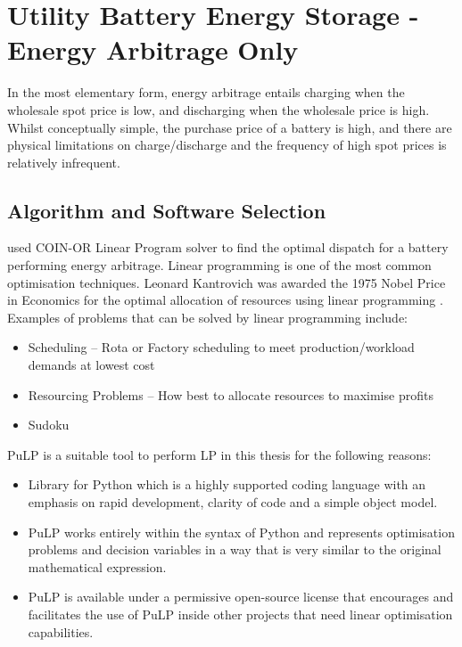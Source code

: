 \chapter{ Utility Battery Energy Storage - Energy Arbitrage Only}
\label{sec:energy_arbitrage}
In the most elementary form, energy arbitrage entails charging when the wholesale spot price is low, and discharging when the wholesale price is high. Whilst conceptually simple, the purchase price of a battery is high, and there are physical limitations on charge/discharge and the frequency of high spot prices is relatively infrequent.
\section{ Algorithm and Software Selection }
\parencite{McConnell} used COIN-OR Linear Program solver to find the optimal dispatch for a battery performing energy arbitrage. Linear programming is one of the most common optimisation techniques. Leonard Kantrovich was awarded the 1975 Nobel Price in Economics for the optimal allocation of resources using linear programming \parencite{PythonPulp}. Examples of problems that can be solved by linear programming include:
\begin{itemize}
    \item Scheduling – Rota or Factory scheduling to meet production/workload demands at lowest cost
    \item Resourcing Problems – How best to allocate resources to maximise profits
    \item Sudoku
\end{itemize}
PuLP is a suitable tool to perform LP in this thesis for the following reasons: 
\begin{itemize}
    \item Library for Python which is a highly supported coding language with an emphasis on rapid development, clarity of code and a simple object model. 
    \item PuLP works entirely within the syntax of Python and represents optimisation problems and decision variables in  a way that is very similar to the original mathematical expression. 
    \item PuLP is available under a permissive open-source license that encourages and facilitates the use of PuLP inside other projects that need linear optimisation capabilities.
\end{itemize}
\newpage
